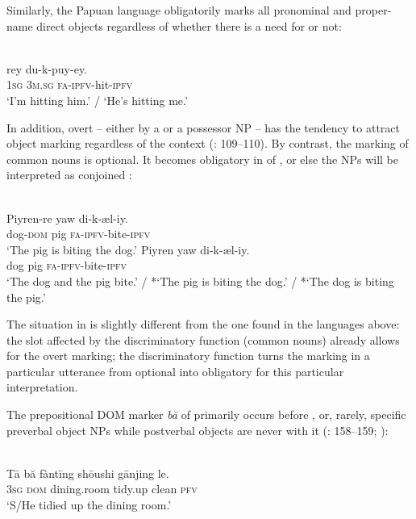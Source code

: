 \documentclass[output=paper]{langsci/langscibook}
\begin{document}
Similarly, the Papuan language  obligatorily marks all pronominal and proper-name direct objects regardless of whether there is a need for  or not:

\ea\label{ex:serzant:18}
\\
\gll *   rey   du-k-puy-ey.\\
     \textsc{1sg}   \textsc{3m.sg}  \textsc{fa-ipfv}{}-hit-\textsc{ipfv}\\
 ‘I’m hitting him.’ / ‘He’s hitting me.’
\z

In addition, overt  –  either by a  or a possessor NP – has the tendency to attract object marking regardless of the context (\citealt{Feldman1986}: 109\-–110). By contrast, the marking of common nouns is optional. It becomes obligatory in  of , or else the NPs will be interpreted as conjoined \citep[110]{Feldman1986}:

\ea\label{ex:serzant:19}
\\
\ea
\gll Piyren-re  yaw  di-k-æl-iy.\\
     dog-\textsc{dom}  pig  \textsc{fa-ipfv}{}-bite-\textsc{ipfv}\\
\glt ‘The pig is biting the dog.’
\ex
\gll Piyren  yaw  di-k-æl-iy.\\
     dog  pig  \textsc{fa-ipfv}{}-bite-\textsc{ipfv}\\
\glt ‘The dog and the pig bite.’ / *‘The pig is biting the dog.’ / *‘The dog is biting the pig.’
\z
\z

The situation in  is slightly different from the one found in the languages above: the slot affected by the discriminatory function (common nouns) already allows for the overt marking; the discriminatory function turns the marking in a particular utterance from optional into obligatory for this particular interpretation.

The prepositional DOM marker \textit{bă} of  primarily occurs before ,  or, rarely,  specific preverbal object NPs while postverbal objects are never  with it (\citealt{LiThompson1981,Bisang1992}: 158–159; \citealt{YangvanBergen2007}):

\ea \label{ex:serzant:20}
\\
\gll Tā   bă   fàntīng   shōushi   gānjing le.\\
     \textsc{3sg}  \textsc{dom}  dining.room   tidy.up   clean   \textsc{pfv}\\
\glt ‘S/He tidied up the dining room.’
\z
\end{document}
